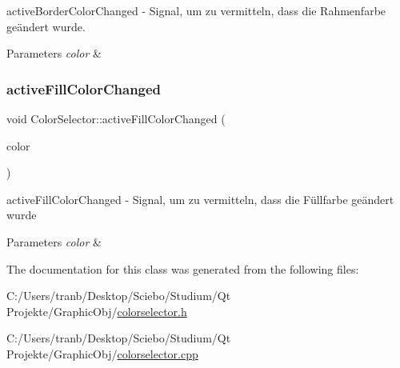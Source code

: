 active\+Border\+Color\+Changed -\/ Signal, um zu vermitteln, dass die Rahmenfarbe geändert wurde. 


\begin{DoxyParams}{Parameters}
{\em color} & \\
\hline
\end{DoxyParams}
\mbox{\label{class_color_selector_a62847504579be68c5bdb138ef7033b20}} 
\subsubsection{\texorpdfstring{active\+Fill\+Color\+Changed}{activeFillColorChanged}}
{\footnotesize\ttfamily void Color\+Selector\+::active\+Fill\+Color\+Changed (\begin{DoxyParamCaption}\item[{Q\+Color}]{color }\end{DoxyParamCaption})\hspace{0.3cm}{\ttfamily [signal]}}



active\+Fill\+Color\+Changed -\/ Signal, um zu vermitteln, dass die Füllfarbe geändert wurde 


\begin{DoxyParams}{Parameters}
{\em color} & \\
\hline
\end{DoxyParams}


The documentation for this class was generated from the following files\+:\begin{DoxyCompactItemize}
\item 
C\+:/\+Users/tranb/\+Desktop/\+Sciebo/\+Studium/\+Qt Projekte/\+Graphic\+Obj/\hyperlink{colorselector_8h}{colorselector.\+h}\item 
C\+:/\+Users/tranb/\+Desktop/\+Sciebo/\+Studium/\+Qt Projekte/\+Graphic\+Obj/\hyperlink{colorselector_8cpp}{colorselector.\+cpp}\end{DoxyCompactItemize}
